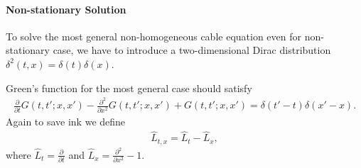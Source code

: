 \documentclass[letterpaper,10pt,english]{sphinxmanual}
\begin{document}
\paragraph{Non-stationary Solution}
\label{\detokenize{equation-solving-in-neuroscience/green-function:non-stationary-solution}}
To solve the most general non-homogeneous cable equation even for non-stationary case, we have to introduce a two-dimensional Dirac distribution \(\delta^2(t,x) = \delta(t)\delta(x)\).

Green’s function for the most general case should satisfy \label{\detokenize{equation-solving-in-neuroscience/green-function:id12}}{\hyperref[\detokenize{equation-solving-in-neuroscience/green-function:gerstner2002}]{\sphinxcrossref{{[}Gerstner2002{]}}}}
\begin{equation*}
\begin{split}\frac{\partial}{\partial t} G(t,t';x,x') - \frac{\partial^2}{\partial x^2}  G(t,t';x,x') +  G(t,t';x,x') = \delta(t'-t)\delta(x'-x).\end{split}
\end{equation*}
Again to save ink we define
\begin{equation*}
\begin{split}\hat L_{t,x} = \hat L_t - \hat L_x,\end{split}
\end{equation*}
where \(\hat L_t = \frac{\partial}{\partial t}\) and \(\hat L_x = \frac{\partial^2}{\partial x^2} - 1\).
\end{document}
